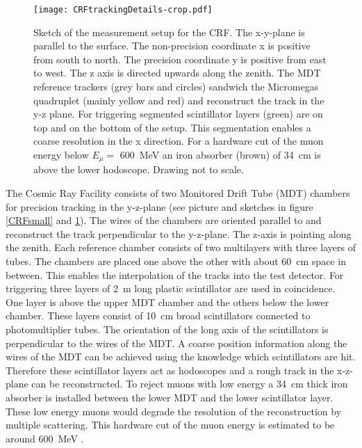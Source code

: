 \documentclass[
twoside,            %
BCOR1.4cm,          %
10pt,               %
headings=normal,    %
headsepline,        %
clearplainpage,		%
final,              %
div=14,
open=right,
bibliography=toc
]{scrreprt}
\begin{document}
\begin{figure}[!h]
	\centering
	\texttt{[image: CRFtrackingDetails-crop.pdf]}
	\vspace{-2mm}
	\caption{
		Sketch of the measurement setup for the CRF.
		The x-y-plane is parallel to the surface.
		The non-precision coordinate x is positive from south to north.
		The precision coordinate y is positive from east to west.
		The z axis is directed upwards along the zenith.
		The MDT reference trackers (grey bars and circles) sandwich the Micromegas quadruplet (mainly yellow and red) and reconstruct the track in the y-z plane.
		For triggering segmented scintillator layers (green) are on top and on the bottom of the setup.
		This segmentation enables a coarse resolution in the x direction.
		For a hardware cut of the muon energy below $E_{\mu} = $ \SI{600}{MeV} an iron absorber (brown) of \SI{34}{cm} is above the lower hodoscope.
		Drawing not to scale.
	}
	\label{CRFtracking} 
\end{figure}

The Cosmic Ray Facility consists of two Monitored Drift Tube (MDT) chambers for precision tracking in the y-z-plane (see picture and sketches in figure \ref{CRFsmall} and \ref{CRFtracking}).
The wires of the chambers are oriented parallel to and reconstruct the track perpendicular to the y-z-plane.
The z-axis is pointing along the zenith.
Each reference chamber consists of two multilayers with three layers of tubes.
The chambers are placed one above the other with about \SI{60}{cm} space in between.
This enables the interpolation of the tracks into the test detector.
For triggering three layers of \SI{2}{m} long plastic scintillator are used in coincidence.
One layer is above the upper MDT chamber and the others below the lower chamber.
These layers consist of \SI{10}{cm} broad scintillators connected to photomultiplier tubes.
The orientation of the long axis of the scintillators is perpendicular to the wires of the MDT.
A coarse position information along the wires of the MDT can be achieved using the knowledge which scintillators are hit. 
Therefore these scintillator layers act as hodoscopes and a rough track in the x-z-plane can be reconstructed.
To reject muons with low energy a \SI{34}{cm} thick iron absorber is installed between the lower MDT and the lower scintillator layer.
These low energy muons would degrade the resolution of the reconstruction by multiple scattering.
This hardware cut of the muon energy is estimated to be around \SI{600}{MeV} \cite{rauscherThesis}.
\end{document}
